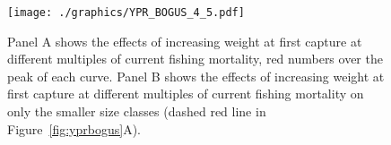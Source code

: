 \documentclass[12pt,letterpaper,twoside]{article}
\begin{document}
\begin{figure}
\begin{center}
\texttt{[image: ./graphics/YPR\_BOGUS\_4\_5.pdf]}
\caption{\label{fig:yprmultibogus}
Panel A shows the effects of increasing weight at first capture at
different multiples of current fishing mortality, red numbers over the
peak of each curve.
Panel B shows the effects of increasing weight at first capture at
different multiples of current fishing mortality on only the smaller
size classes (dashed red line in Figure~\ref{fig:yprbogus}A).
}
\end{center}
\end{figure}
\end{document}
